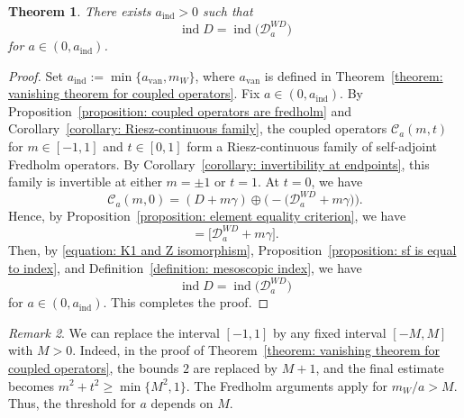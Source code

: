 \documentclass[a4paper,oneside,12pt]{amsart}
\theoremstyle{plain}
\newtheorem{theorem}{Theorem}[section]
\theoremstyle{definition}
\theoremstyle{remark}
\newtheorem{remark}[theorem]{Remark}
\DeclareMathOperator{\indexAtiyahSinger}{ind}
\newcommand{\mesoscopicWilsonDiracoperator}[1][a]{\mathcal{D}_{#1}^{\mathit{WD}}}
\newcommand{\coupledoperator}[3][a]{\mathcal{C}_{#1}(#2,#3)}
\newcommand{\constantAvan}{a_{\mathrm{van}}}
\newcommand{\constantAindex}{a_{\mathrm{ind}}}
\begin{document}
\begin{theorem}\label{theorem: main theorem}
  There exists $\constantAindex > 0$ such that
  \begin{equation}
    \indexAtiyahSinger D = \indexAtiyahSinger \bigl( \mesoscopicWilsonDiracoperator \bigr)
  \end{equation}
  for $a \in (0,\constantAindex)$.
\end{theorem}
\begin{proof}
  Set $\constantAindex := \min \{\constantAvan, m_W\}$, where $\constantAvan$ is defined in Theorem~\ref{theorem: vanishing theorem for coupled operators}.
  Fix $a \in (0,\constantAindex)$.
  By Proposition~\ref{proposition: coupled operators are fredholm} and Corollary~\ref{corollary: Riesz-continuous family}, the coupled operators $\coupledoperator{m}{t}$ for $m \in [-1,1]$ and $t \in [0,1]$ form a Riesz-continuous family of self-adjoint Fredholm operators.
  By Corollary~\ref{corollary: invertibility at endpoints}, this family is invertible at either $m = \pm 1$ or $t = 1$.
  At $t = 0$, we have
  \begin{equation}
    \coupledoperator{m}{0} = (D+m\gamma) \oplus \bigl(- \bigl(\mesoscopicWilsonDiracoperator + m\gamma \bigr) \bigr).
  \end{equation}
  Hence, by Proposition~\ref{proposition: element equality criterion}, we have
  \begin{equation}
    [D+m\gamma] = \bigl[ \mesoscopicWilsonDiracoperator + m\gamma \bigr].
  \end{equation}
  Then, by \eqref{equation: K1 and Z isomorphism}, Proposition~\ref{proposition: sf is equal to index}, and Definition~\ref{definition: mesoscopic index}, we have
  \begin{equation}
    \indexAtiyahSinger D = \indexAtiyahSinger \bigl( \mesoscopicWilsonDiracoperator \bigr)
  \end{equation}
  for $a \in (0,\constantAindex)$.
  This completes the proof.
\end{proof}

\begin{remark}
  We can replace the interval $[-1,1]$ by any fixed interval $[-M,M]$ with $M > 0$.
  Indeed, in the proof of Theorem~\ref{theorem: vanishing theorem for coupled operators}, the bounds $2$ are replaced by $M+1$, and the final estimate becomes $m^2 + t^2 \ge \min \{M^2, 1\}$.
  The Fredholm arguments apply for $m_W/a > M$.
  Thus, the threshold for $a$ depends on $M$.
\end{remark}
\end{document}
